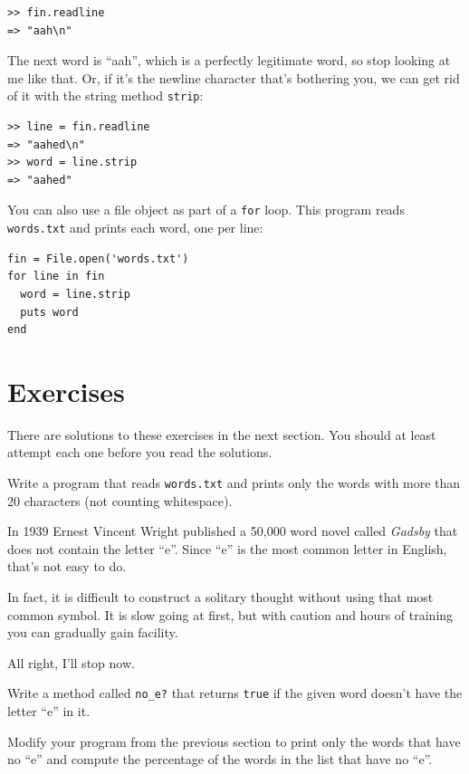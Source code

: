 \documentclass[10pt]{book}
\begin{document}
\begin{verbatim}
>> fin.readline
=> "aah\n"
\end{verbatim}
%
The next word is ``aah'', which is a perfectly legitimate
word, so stop looking at me like that.
Or, if it's the newline character that's bothering you,
we can get rid of it with the string method {\tt strip}:

\begin{verbatim}
>> line = fin.readline
=> "aahed\n"
>> word = line.strip
=> "aahed"
\end{verbatim}
%
You can also use a file object as part of a {\tt for} loop.
This program reads {\tt words.txt} and prints each word, one
per line:

\begin{verbatim}
fin = File.open('words.txt')
for line in fin
  word = line.strip
  puts word
end
\end{verbatim}
%

\section{Exercises}

There are solutions to these exercises in the next section.
You should at least attempt each one before you read the solutions.

\begin{exercise}
Write a program that reads {\tt words.txt} and prints only the
words with more than 20 characters (not counting whitespace).

\end{exercise}

\begin{exercise}

In 1939 Ernest Vincent Wright published a 50,000 word novel called
{\em Gadsby} that does not contain the letter ``e''.  Since ``e'' is
the most common letter in English, that's not easy to do.

In fact, it is difficult to construct a solitary thought without using
that most common symbol.  It is slow going at first, but with caution
and hours of training you can gradually gain facility.

All right, I'll stop now.

Write a method called \verb"no_e?" that returns {\tt true} if
the given word doesn't have the letter ``e'' in it.

Modify your program from the previous section to print only the words
that have no ``e'' and compute the percentage of the words in the list
that have no ``e''.

\end{exercise}
\end{document}
